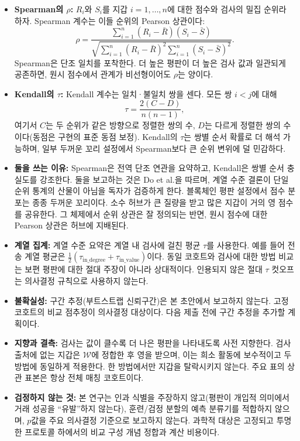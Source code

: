 \begin{itemize}
\item \textbf{Spearman의 $\rho$:} $R_i$와 $S_i$를 지갑 $i=1,\ldots,n$에 대한 점수와 검사의 밀집 순위라 하자. Spearman 계수는 이들 순위의 Pearson 상관이다:
\begin{equation}
\label{eq:spearman-ops}
\rho
=
\frac{\sum_{i=1}^{n}(R_i-\bar R)(S_i-\bar S)}
{\sqrt{\sum_{i=1}^{n}(R_i-\bar R)^2\sum_{i=1}^{n}(S_i-\bar S)^2}}.
\end{equation}
Spearman은 단조 일치를 포착한다. 더 높은 평판이 더 높은 검사 값과 일관되게 공존하면, 원시 점수에서 관계가 비선형이어도 $\rho$는 양이다.

\item \textbf{Kendall의 $\tau$:} Kendall 계수는 일치·불일치 쌍을 센다. 모든 쌍 $i<j$에 대해
\begin{equation}
\label{eq:kendall-ops}
\tau
=
\frac{2(C-D)}{n(n-1)},
\end{equation}
여기서 $C$는 두 순위가 같은 방향으로 정렬한 쌍의 수, $D$는 다르게 정렬한 쌍의 수이다(동점은 구현의 표준 동점 보정). Kendall의 $\tau$는 쌍별 순서 확률로 더 해석 가능하며, 일부 두꺼운 꼬리 설정에서 Spearman보다 큰 순위 변위에 덜 민감하다.

\item \textbf{둘을 쓰는 이유:} Spearman은 전역 단조 연관을 요약하고, Kendall은 쌍별 순서 충실도를 강조한다. 둘을 보고하는 것은 Do et al.을 따르며, 계열 수준 결론이 단일 순위 통계의 산물이 아님을 독자가 검증하게 한다. 블록체인 평판 설정에서 점수 분포는 종종 두꺼운 꼬리이다. 소수 허브가 큰 질량을 받고 많은 지갑이 거의 영 점수를 공유한다. 그 체제에서 순위 상관은 잘 정의되는 반면, 원시 점수에 대한 Pearson 상관은 허브에 지배된다.

\item \textbf{계열 집계:} 계열 수준 요약은 계열 내 검사에 걸친 평균 $\tau$를 사용한다. 예를 들어 전송 계열 평균은 $\tfrac{1}{2}(\tau_{\mathrm{in\_degree}}+\tau_{\mathrm{in\_value}})$이다. 동일 코호트와 검사에 대한 방법 비교는 보편 평판에 대한 절대 주장이 아니라 상대적이다. 인용되지 않은 절대 $\tau$ 컷오프는 의사결정 규칙으로 사용하지 않는다.

\item \textbf{불확실성:} 구간 추정(부트스트랩 신뢰구간)은 본 초안에서 보고하지 않는다. 고정 코호트의 비교 점추정이 의사결정 대상이다. 다음 제출 전에 구간 추정을 추가할 계획이다.

\item \textbf{지향과 결측:} 검사는 값이 클수록 더 나은 평판을 나타내도록 사전 지향한다. 검사 출처에 없는 지갑은 $\mathcal{W}$에 정합한 후 영을 받으며, 이는 희소 활동에 보수적이고 두 방법에 동일하게 적용한다. 한 방법에서만 지갑을 탈락시키지 않는다. 주요 표의 상관 표본은 항상 전체 매칭 코호트이다.

\item \textbf{검정하지 않는 것:} 본 연구는 인과 식별을 주장하지 않고(평판이 개입적 의미에서 거래 성공을 ``유발''하지 않는다), 훈련/검정 분할의 예측 분류기를 적합하지 않으며, $p$값을 주요 의사결정 기준으로 보고하지 않는다. 과학적 대상은 고정되고 투명한 프로토콜 하에서의 비교 구성 개념 정합과 계산 비용이다.

\end{itemize}

